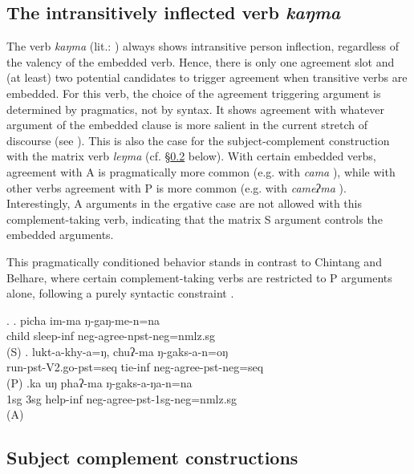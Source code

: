 	
\subsection{The intransitively inflected verb  \emph{kaŋma} }

The verb \emph{kaŋma}   (lit.: ) always shows intransitive person inflection, regardless of the valency of the embedded verb. Hence, there is only one agreement slot and (at least) two potential candidates to trigger  agreement when transitive verbs are embedded. For this  verb, the choice of the agreement triggering argument is determined by pragmatics, not by syntax. It shows agreement with whatever argument of the embedded clause is more salient in the current stretch of discourse (see \Next). This is also the case for the subject-complement construction with the matrix verb \emph{leŋma}  (cf. §\ref{subjectcomplement} below). With certain embedded verbs, agreement with A is pragmatically more common (e.g. with \emph{cama} ), while with other  verbs agreement with P is more common (e.g. with \emph{cameʔma} ). Interestingly, A arguments in the ergative case are not allowed with this complement-taking verb, indicating that the matrix S argument controls the embedded arguments.

This pragmatically conditioned behavior stands in contrast to Chintang and Belhare, where certain complement-taking verbs are restricted to P arguments alone, following a purely syntactic constraint \citep{Bickeletal2001Syntactic, Bickeletal2010Ditransitives}. 

\ex. \ag. picha im-ma ŋ-gaŋ-me-n=na\\
child sleep-{\sc inf} {\sc neg}-agree{\sc [3sg]-npst-neg=nmlz.sg}\\
 (S)
\bg. lukt-a-khy-a=ŋ, chuʔ-ma  ŋ-gaks-a-n=oŋ\\
run{\sc [3sg]-pst-V2.go-pst=seq} tie{\sc -inf} {\sc neg-}agree{\sc [3sg]-pst-neg=seq}\\
 (P)  
\bg.ka uŋ phaʔ-ma ŋ-gaks-a-ŋa-n=na\\
{\sc 1sg} {\sc 3sg} help{\sc -inf} {\sc neg-}agree{\sc -pst-1sg-neg=nmlz.sg}\\
 (A)


\subsection{Subject complement constructions}\label{subjectcomplement}

